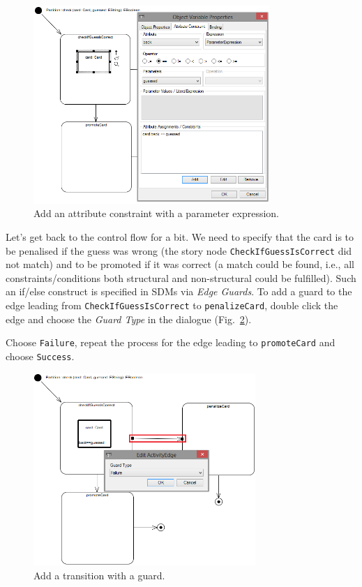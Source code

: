 \begin{figure}[htbp]
\begin{center}
  \includegraphics[width=0.8\textwidth]{pics/sdmBilder/check/sdm18RAW}
  \caption{Add an attribute constraint with a parameter expression.}
  \label{fig:sdm_check_att_constraint}
\end{center}
\end{figure}

Let's get back to the control flow for a bit.  We need to specify that the card
is to be penalised if the guess was wrong (the story node
\texttt{Check\-If\-Guess\-Is\-Correct} did not match) and to be promoted if it
was correct (a match could be found, i.e., all constraints/conditions both
structural and non-structural could be fulfilled).  Such an if/else construct is
specified in SDMs via \emph{Edge Guards}.  To add a guard to the edge leading
from \texttt{Check\-If\-Guess\-Is\-Correct} to \texttt{penalize\-Card}, double
click the edge and choose the \emph{Guard Type} in the dialogue
(Fig.~\ref{fig:sdm_check_guard}).  

Choose \texttt{Failure}, repeat the process
for the edge leading to \texttt{promoteCard} and choose \texttt{Success}.

\begin{figure}[htbp]
\begin{center}
  \includegraphics[width=0.75\textwidth]{pics/sdmBilder/check/sdm19}
  \caption{Add a transition with a guard.}
  \label{fig:sdm_check_guard}
\end{center}
\end{figure}


